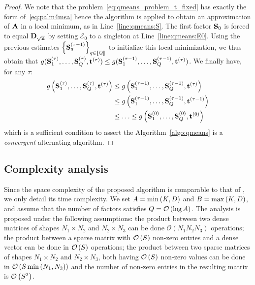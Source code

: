 \begin{proof}
We note that the problem~\eqref{eq:qmeans_problem_t_fixed} has exactly the form of~\eqref{eq:palm4msa} hence the \palm algorithm is applied to obtain an approximation of ${\mathbf{A}}$ in a local minimum, as in Line~\ref{line:qmeans:S}. The first factor ${\mathbf{S}}_0$ is forced to equal ${\mathbf{D}}_{\sqrt{{\mathbf{n}}}}$ by setting $\mathcal{E}_0$ to a singleton at Line~\ref{line:qmeans:E0}. Using the previous estimates $\left \lbrace {\mathbf{S}}_q^{(\tau-1)}\right \rbrace_{q\in\left \llbracket Q\right \rrbracket}$ to initialize this local minimization, we thus obtain that $g({\mathbf{S}}_1^{(\tau)}, \ldots,{\mathbf{S}}_Q^{(\tau)}, {\mathbf{t}}^{(\tau)}) \leq g({\mathbf{S}}_1^{(\tau-1)}, \ldots,{\mathbf{S}}_Q^{(\tau-1)}, {\mathbf{t}}^{(\tau)})$.
We finally have, for any $\tau$:
\begin{align*}
g\left ({\mathbf{S}}_1^{(\tau)}, \ldots,{\mathbf{S}}_Q^{(\tau)}, {\mathbf{t}}^{(\tau)}\right ) & \leq g\left ({\mathbf{S}}_1^{(\tau-1)}, \ldots,{\mathbf{S}}_Q^{(\tau-1)}, {\mathbf{t}}^{(\tau)}\right ) \\
& \leq g\left ({\mathbf{S}}_1^{(\tau-1)}, \ldots,{\mathbf{S}}_Q^{(\tau-1)}, {\mathbf{t}}^{(\tau-1)}\right ) \\
& \leq \ldots \leq g\left ({\mathbf{S}}_1^{(0)}, \ldots,{\mathbf{S}}_Q^{(0)}, {\mathbf{t}}^{(0)}\right )
\end{align*}
which is a sufficient condition to assert the Algorithm~\ref{algo:qmeans} is a \textit{convergent} alternating algorithm.

\end{proof}


\subsection{Complexity analysis}
\label{sec:qkmeans:complexity}

Since the space complexity of the proposed \qkmeans algorithm is comparable to that of \kmeans, we only detail its time complexity. We set $A=\min\left (K, D\right )$ and $B=\max\left (K, D\right )$, and assume that the number of factors satisfies $Q=\mathcal{O}\left(\log A\right)$.
The analysis is proposed under the following assumptions: the product between two dense matrices of shapes ${N_1\times N_2}$ and ${N_2\times N_3}$ can be done $\mathcal{O}\left (N_1 N_2 N_3 \right )$ operations; 
the product between a sparse matrix with $\mathcal{O}\left(S\right)$ non-zero entries and a dense vector can be done in $\mathcal{O}\left(S\right)$ operations; 
the product between two sparse matrices of shapes ${N_1\times N_2}$ and ${N_2\times N_3}$, both having $\mathcal{O}\left(S\right)$ non-zero values can be done in $\mathcal{O}\left(S \min\left (N_1, N_3\right )\right)$ and the number of non-zero entries in the resulting matrix is $\mathcal{O}\left(S^2\right)$.


